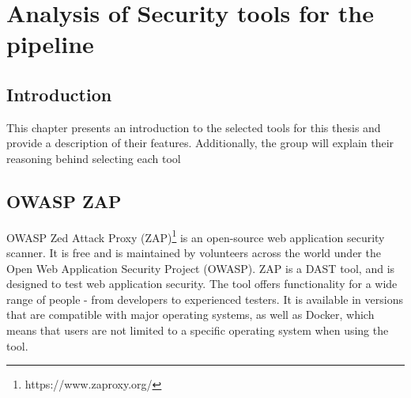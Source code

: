 \chapter{Analysis of Security tools for the pipeline}

\section{Introduction}
This chapter presents an introduction to the selected tools for this thesis and provide a description of their features. Additionally, the group will explain their reasoning behind selecting each tool




\section{OWASP ZAP}
OWASP Zed Attack Proxy (ZAP)\footnote{https://www.zaproxy.org/} is an open-source web application security scanner. It is free and is maintained by volunteers across the world under the Open Web Application Security Project (OWASP). ZAP is a DAST tool, and is designed to test web application security. The tool offers functionality for a wide range of people - from developers to experienced testers. It is available in versions that are compatible with major operating systems, as well as Docker, which means that users are not limited to a specific operating system when using the tool.\cite{owaspZAP}

